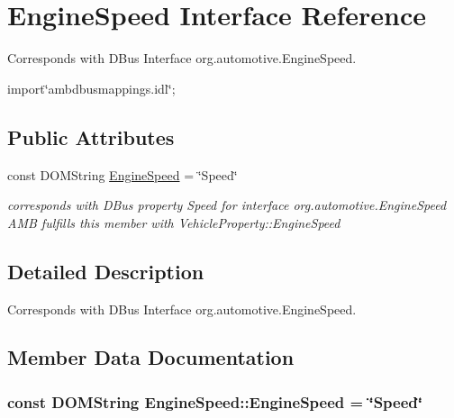 \hypertarget{interfaceEngineSpeed}{\section{Engine\+Speed Interface Reference}
\label{interfaceEngineSpeed}
}


Corresponds with D\+Bus Interface org.\+automotive.\+Engine\+Speed.  




{\ttfamily import\char`\"{}ambdbusmappings.\+idl\char`\"{};}

\subsection*{Public Attributes}
\begin{DoxyCompactItemize}
\item 
const D\+O\+M\+String \hyperlink{interfaceEngineSpeed_ac3274655997a773e5ba9d9d7c0f7dd03}{Engine\+Speed} = \char`\"{}Speed\char`\"{}
\begin{DoxyCompactList}\small\item\em corresponds with D\+Bus property Speed for interface org.\+automotive.\+Engine\+Speed A\+M\+B fulfills this member with Vehicle\+Property\+::\+Engine\+Speed \end{DoxyCompactList}\end{DoxyCompactItemize}


\subsection{Detailed Description}
Corresponds with D\+Bus Interface org.\+automotive.\+Engine\+Speed. 

\subsection{Member Data Documentation}
\hypertarget{interfaceEngineSpeed_ac3274655997a773e5ba9d9d7c0f7dd03}{
\subsubsection[{Engine\+Speed}]{\setlength{\rightskip}{0pt plus 5cm}const D\+O\+M\+String Engine\+Speed\+::\+Engine\+Speed = \char`\"{}Speed\char`\"{}}}\label{interfaceEngineSpeed_ac3274655997a773e5ba9d9d7c0f7dd03}


